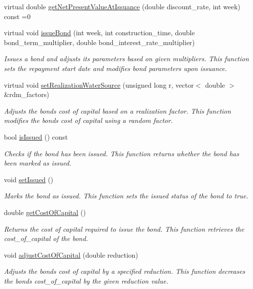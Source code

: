 \begin{DoxyCompactItemize}
virtual double \mbox{\hyperlink{classBond_a5997278813deb16aa5d01bbca8ecc7b2}{get\+Net\+Present\+Value\+At\+Issuance}} (double discount\+\_\+rate, int week) const =0
\item 
virtual void \mbox{\hyperlink{classBond_a726edbe3ea7047ebc7246585943763e3}{issue\+Bond}} (int week, int construction\+\_\+time, double bond\+\_\+term\+\_\+multiplier, double bond\+\_\+interest\+\_\+rate\+\_\+multiplier)
\begin{DoxyCompactList}\small\item\em Issues a bond and adjusts its parameters based on given multipliers. This function sets the repayment start date and modifies bond parameters upon issuance. \end{DoxyCompactList}\item 
virtual void \mbox{\hyperlink{classBond_aadfa02c42f31c590cee31a455bdda0b2}{set\+Realization\+Water\+Source}} (unsigned long r, vector$<$ double $>$ \&rdm\+\_\+factors)
\begin{DoxyCompactList}\small\item\em Adjusts the bond\textquotesingle{}s cost of capital based on a realization factor. This function modifies the bond\textquotesingle{}s cost of capital using a random factor. \end{DoxyCompactList}\item 
bool \mbox{\hyperlink{classBond_a6342f3dd3295771b71ac1fcc3b666a42}{is\+Issued}} () const
\begin{DoxyCompactList}\small\item\em Checks if the bond has been issued. This function returns whether the bond has been marked as issued. \end{DoxyCompactList}\item 
void \mbox{\hyperlink{classBond_a573de514b0044cec6a76bb63b098b40a}{set\+Issued}} ()
\begin{DoxyCompactList}\small\item\em Marks the bond as issued. This function sets the {\ttfamily issued} status of the bond to {\ttfamily true}. \end{DoxyCompactList}\item 
double \mbox{\hyperlink{classBond_aa3773136ec3327a88226859ea950a7b3}{get\+Cost\+Of\+Capital}} ()
\begin{DoxyCompactList}\small\item\em Returns the cost of capital required to issue the bond. This function retrieves the {\ttfamily cost\+\_\+of\+\_\+capital} of the bond. \end{DoxyCompactList}\item 
void \mbox{\hyperlink{classBond_ad4e613d485dd3f1de25c8faf21faec35}{adjust\+Cost\+Of\+Capital}} (double reduction)
\begin{DoxyCompactList}\small\item\em Adjusts the bond\textquotesingle{}s cost of capital by a specified reduction. This function decreases the bond\textquotesingle{}s {\ttfamily cost\+\_\+of\+\_\+capital} by the given reduction value. \end{DoxyCompactList}\end{DoxyCompactItemize}

